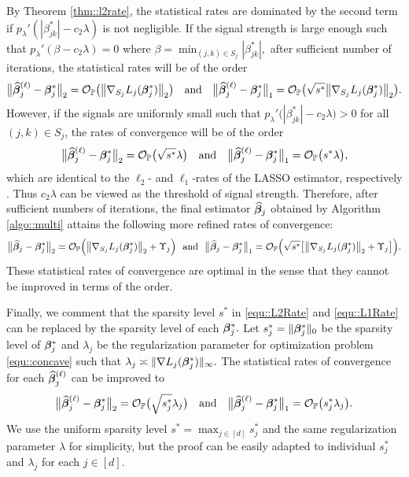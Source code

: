 \documentclass[twoside,11pt]{article}
\newcommand*{\hbbeta}{\hat{\bbeta}}
\newcommand*{\bbetas}{\bbeta^*}
\newcommand*{\gradstarss} {\nabla {L_j}(\bbeta^*_{j})}
\newcommand*{\hbbetas}{\hat{\bbeta}_{j}}
\newcommand*{\bbetass}{\bbeta^*_{j}}
\begin{document}
 
By Theorem \ref{thm::l2rate},  the statistical rates are  dominated by the second term if $p_{\lambda}'(|\beta_{jk}^*| \!-\! c_2\lambda)$ is not negligible. If the signal strength is large enough such that $p_{\lambda}'(\beta\!-\! c_2\lambda)\! =\!0$  where $\beta \!=\! \min_{(j,k)\in S_j} |\beta^*_{jk} |,$ after sufficient number of iterations, the statistical rates will be of the order
$$
\big \| \hbbetas^{(\ell)}- \bbetass\big\| _2= \cO_{\PP}\bigl(\big\|\nabla_{S_j} L_j(\bbetas_j)\big\|_2 \bigr) \quad \text{and}\quad \big \| \hbbetas^{(\ell)}- \bbetass\big\| _1 = \cO_{\PP}\bigl(\sqrt{s^*}\big\|\nabla_{S_j} L_j(\bbetas_j)\big\|_2 \bigr).
$$
However, if the signals are uniformly small such that $p_{\lambda}'\bigl( |\beta_{jk}^*| \!-\! c_2\lambda\bigr)\! >\! 0$ for all $(j,k)\!\in\! S_j$, 
the rates of convergence will be of the order
$$
\big \| \hbbetas^{(\ell)}- \bbetass\big\| _2 = \cO_{\PP}\bigl(\sqrt{s^*}\lambda\bigr) \quad \text{and}\quad \big \| \hbbetas^{(\ell)}- \bbetass\big\| _1 = \cO_{\PP}\bigl(s^*\lambda\bigr),
$$
which are identical to the $\ell_2$- and $\ell_1$-rates of the LASSO estimator, respectively \citep{ning2014sparc}. 
Thus $c_2 \lambda$ can be viewed as the threshold of signal strength. Therefore,  after sufficient numbers of iterations, the final estimator $\hbbeta_j$ obtained by Algorithm \ref{algo::multi} attains the following more refined rates of convergence:
$$
\big \| \hbbetas- \bbetass\big\| _2 = \cO_{\PP}\Bigl(\bigl \| \nabla _{S_j}L_j(\bbetas_j) \bigr\|_2 + \Upsilon_j\Bigr) ~~ \text{and}~~\big \| \hbbetas- \bbetass\big\| _1 = \cO_{\PP}\Bigl(\sqrt{s^*}\bigl[\bigl \| \nabla _{S_j}L_j(\bbetas_j) \bigr\|_2 + \Upsilon_j\bigr]\Bigr).
$$
These statistical rates of convergence are optimal in the sense that they cannot be improved in terms of the  order.


Finally, we comment that the sparsity level $s^*$ in \eqref{equ::L2Rate} and \eqref{equ::L1Rate} can be replaced by the sparsity level of each $\bbetass.$ Let $s_j^*  =   \| \bbetass  \|_0$ be the sparsity level of $\bbetas_j$ and $\lambda_j$ be the regularization parameter for optimization problem \eqref{equ::concave} such that $\lambda_j  \asymp  \| \gradstarss  \|_\infty.$ %
The statistical rates of convergence for each $\hbbeta_j^{(\ell)}$ can be improved to
$$
\big \| \hbbetas^{(\ell)}- \bbetass\big\| _2 = \cO_{\PP}\bigl(\sqrt{s_j^*}\lambda_j\bigr) \quad \text{and}\quad \big \| \hbbetas^{(\ell)}- \bbetass\big\| _1 = \cO_{\PP}\bigl(s_j^*\lambda_j\bigr).
$$
We use the uniform sparsity level $s^*\! =\! \max_{j\in [d]} s_j^*$ and the same regularization parameter $\lambda$ for simplicity, but the proof can be easily adapted to individual $s_j^*$ and $\lambda_j$ for each $j\!\in\! [d].$
 
\end{document}
